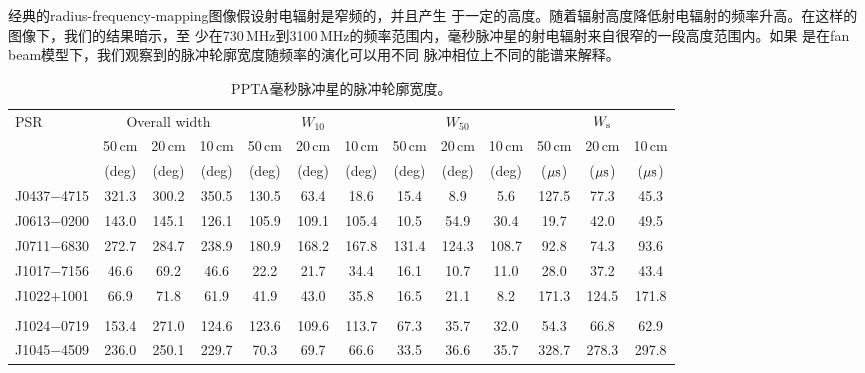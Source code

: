 经典的radius-frequency-mapping图像\supercite{Cordes78}假设射电辐射是窄频的，并且产生
于一定的高度。随着辐射高度降低射电辐射的频率升高。在这样的图像下，我们的结果暗示，至
少在730\,MHz到3100\,MHz的频率范围内，毫秒脉冲星的射电辐射来自很窄的一段高度范围内。如果
是在fan beam模型下\supercite{Wang14}，我们观察到的脉冲轮廓宽度随频率的演化可以用不同
脉冲相位上不同的能谱来解释。

\begin{landscape}
\begin{table}
\begin{center}
\caption{PPTA毫秒脉冲星的脉冲轮廓宽度。}
\label{tableWidth}
\begin{tabular}{lcccccccccccc}
\hline
PSR              & \multicolumn{3}{c}{Overall width} &        & $W_{10}$&        &       &  $W_{50}$ &      &       &  $W_{\rm{s}}$&       \\
								 &  50\,cm & 20\,cm & 10\,cm         & 50\,cm & 20\,cm  & 10\,cm & 50\,cm& 20\,cm    &10\,cm&50\,cm &  20\,cm      &10\,cm \\
								 &  (deg) &  (deg) & (deg)           & (deg)  & (deg)   & (deg)  & (deg) &   (deg)   & (deg)& ($\rm{\mu s}$) & ($\rm{\mu s}$) & ($\rm{\mu s}$)  \\
\hline
J0437$-$4715     & 321.3 &  300.2 &  350.5  &   130.5     & 63.4   & 18.6   & 15.4  & 8.9   & 5.6     &  127.5  &  77.3   & 45.3    \\
J0613$-$0200     & 143.0 &  145.1 &  126.1  &   105.9     & 109.1  & 105.4  & 10.5  & 54.9  & 30.4    &  19.7   &  42.0   & 49.5    \\
J0711$-$6830     & 272.7 &  284.7 &  238.9  &   180.9     & 168.2  & 167.8  & 131.4 & 124.3 & 108.7   &  92.8   &  74.3   & 93.6    \\
J1017$-$7156     & 46.6  &  69.2  &  46.6   &   22.2      & 21.7   & 34.4   & 16.1  & 10.7  & 11.0    &  28.0   &  37.2   & 43.4    \\
J1022$+$1001     & 66.9  &  71.8  &  61.9   &   41.9      & 43.0   & 35.8   & 16.5  & 21.1  & 8.2     &  171.3  &  124.5  & 171.8   \\
	               &       &        &         &             &        &        &       &       &         &         &         &         \\     
J1024$-$0719     & 153.4 &  271.0 &  124.6  &   123.6     & 109.6  & 113.7  & 67.3  & 35.7  & 32.0    &  54.3   &  66.8   & 62.9    \\
J1045$-$4509     & 236.0 &  250.1 &  229.7  &   70.3      & 69.7   & 66.6   & 33.5  & 36.6  & 35.7    &  328.7  &  278.3  & 297.8   \\

\end{tabular}
\end{center}
\end{table}
\end{landscape}
